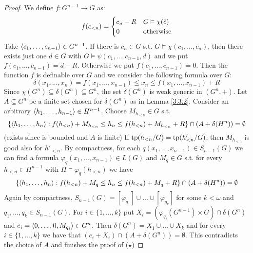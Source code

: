 \documentclass[11pt]{article}
\begin{document}
\begin{proof}
We define \(f:G^{n-1}\to G\) as:
\begin{equation*}
f(c_{<n})=
\begin{cases}
c_n-R&G\vDash\chi(\barc)\\
0&\text{otherwise}
\end{cases}
\end{equation*}
Take \(\langle c_1,\dots,c_{n-1}\rangle\in G^{n-1}\). If there is \(c_n\in G\)
s.t. \(G\vDash\chi(c_1,\dots,c_n)\), then there exists just one \(d\in G\) with \(G\vDash\psi(c_1,\dots,c_{n-1},d)\) and we
put \(f(c_1,\dots,c_{n-1})=d-R\). Otherwise we put \(f(c_1,\dots,c_{n-1})=0\). Then the function \(f\) is
definable over \(G\) and we consider the following formula over \(G\):
\begin{equation*}
\delta(x_1,\dots,x_n)=f(x_1,\dots,x_{n-1})\le x_n\le f(x_1,\dots,x_{n-1})+R
\end{equation*}
Since \(\chi(G^n)\subseteq\delta(G^n)\subseteq G^n\), the set \(\delta(G^n)\) is weak generic in \((G^n,+)\). Let \(A\subseteq G^n\) be a
finite set chosen for \(\delta(G^n)\) as in Lemma \ref{3.3.2}. Consider an
arbitrary \(\langle h_1,\dots,h_{n-1}\rangle\in H^{n-1}\). Choose \(M_{h_{<n}}\in G\) s.t.
\begin{equation*}
\{\langle h_1,\dots,h_n\rangle:f(h_{<n})+M_{h_{<n}}\le h_n\le f(h_{<n})+M_{h_{<n}}+R\}
\cap(A+\delta(H^n))=\emptyset
\end{equation*}
(exists since is bounded and \(A\) is finite)
If \(\operatorname{tp}(h_{<n}/G)=\operatorname{tp}(h'_{<n}/G)\), then \(M_{h_{<n}}\) is good also for \(h'_{<n}\). By
compactness, for each \(q(x_1,\dots,x_{n-1})\in S_{n-1}(G)\) we can find a
formula \(\varphi_q(x_1,\dots,x_{n-1})\in L(G)\) and \(M_q\in G\) s.t. for every \(h_{<n}\in H^{n-1}\) with
\(H\vDash\varphi_q(h_{<n})\) we have
\begin{equation*}
\{\langle h_1,\dots,h_n\rangle:f(h_{<n})+M_q\le h_n\le f(h_{<n})+M_q+R\}\cap(A+\delta(H^n))=\emptyset
\end{equation*}
Again by compactness, \(S_{n-1}(G)=[\varphi_{q_1}]\cup\dots\cup[\varphi_{q_k}]\) for some \(k<\omega\)
and \(q_1,\dots,q_k\in S_{n-1}(G)\).
For \(i\in\{1,\dots,k\}\) put \(X_i=(\varphi_{q_i}(G^{n-1})\times G)\cap\delta(G^n)\)
and \(e_i=\langle 0,\dots,0,M_{q_i}\rangle\in G^n\). Then \(\delta(G^n)=X_1\cup\dots\cup X_k\) and for every \(i\in\{1,\dots,k\}\) we have
that \((e_i+X_i)\cap(A+\delta(G^n))=\emptyset\). This contradicts the choice of \(A\) and finishes the proof of
(\(\star\))


\end{proof}
\end{document}
